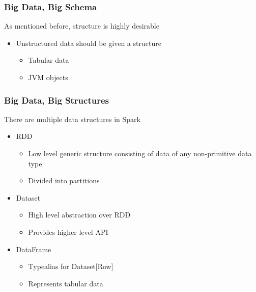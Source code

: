 \documentclass{beamer}
\begin{document}
\begin{frame}
\frametitle{Big Data, Big Schema}
As mentioned before, structure is highly desirable
\begin{itemize}
    \item Unstructured data should be given a structure
    \begin{itemize}
        \item Tabular data
        \item JVM objects
    \end{itemize}
\end{itemize}
\end{frame}

\begin{frame}
\frametitle{Big Data, Big Structures}
There are multiple data structures in Spark
\begin{itemize}
    \item RDD
        \begin{itemize}
            \item Low level generic structure consisting of data of any non-primitive data type
            \item Divided into partitions
        \end{itemize}

    \item Dataset
        \begin{itemize}
            \item High level abstraction over RDD
            \item Provides higher level API
        \end{itemize}

    \item DataFrame
        \begin{itemize}
            \item Typealias for Dataset[Row]
            \item Represents tabular data
        \end{itemize}
\end{itemize}
\end{frame}
\end{document}
